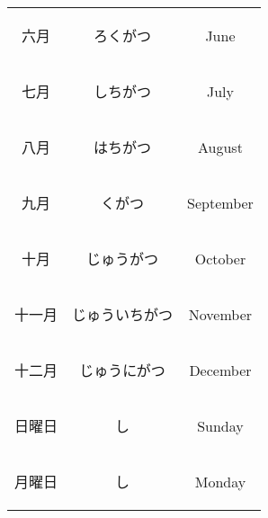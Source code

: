 \begin{center}
\begin{table}[H]
\begin{tabular}{ccc}
		{\begin{CJK}{UTF8}{min} 六月 \end{CJK}} & {\begin{CJK}{UTF8}{min} ろくがつ \end{CJK}} & June \\
		{\begin{CJK}{UTF8}{min} 七月 \end{CJK}} & {\begin{CJK}{UTF8}{min} しちがつ \end{CJK}} & July \\
		{\begin{CJK}{UTF8}{min} 八月 \end{CJK}} & {\begin{CJK}{UTF8}{min} はちがつ \end{CJK}} & August \\
		{\begin{CJK}{UTF8}{min} 九月 \end{CJK}} & {\begin{CJK}{UTF8}{min} くがつ \end{CJK}} & September \\
		{\begin{CJK}{UTF8}{min} 十月 \end{CJK}} & {\begin{CJK}{UTF8}{min} じゅうがつ \end{CJK}} & October \\
		{\begin{CJK}{UTF8}{min} 十一月 \end{CJK}} & {\begin{CJK}{UTF8}{min} じゅういちがつ \end{CJK}} & November \\
		{\begin{CJK}{UTF8}{min} 十二月 \end{CJK}} & {\begin{CJK}{UTF8}{min} じゅうにがつ \end{CJK}} & December \\
		\midrule
		{\begin{CJK}{UTF8}{min} 日曜日 \end{CJK}} & {\begin{CJK}{UTF8}{min} し \end{CJK}} & Sunday \\
		{\begin{CJK}{UTF8}{min} 月曜日 \end{CJK}} & {\begin{CJK}{UTF8}{min} し \end{CJK}} & Monday \\

\end{tabular}
\end{table}
\end{center}
